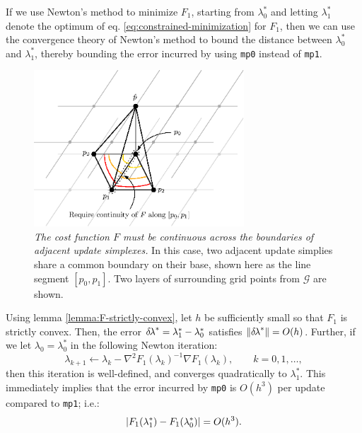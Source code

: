 \documentclass[smallcondensed]{svjour3}
\begin{document}
If we use Newton's method to minimize $F_1$, starting from
$\lambda_0^*$ and letting $\lambda_1^*$ denote the optimum of eq.\@
\ref{eq:constrained-minimization} for $F_1$, then we can use the
convergence theory of Newton's method to bound the distance between
$\lambda_0^*$ and $\lambda_1^*$, thereby bounding the error incurred
by using \texttt{mp0} instead of \texttt{mp1}.
\begin{figure}
  \centering
  \includegraphics[width=0.7\textwidth]{continuity.eps}
  \caption{\emph{The cost function $F$ must be continuous across the
      boundaries of adjacent update simplexes.} In this case, two
    adjacent update simplies share a common boundary on their base,
    shown here as the line segment $[p_0, p_1]$. Two layers of
    surrounding grid points from $\mathcal{G}$ are
    shown.}\label{fig:continuity}
\end{figure}


\begin{theorem}\label{thm:mp0-newton}
  Using lemma \ref{lemma:F-strictly-convex}, let $h$ be sufficiently
  small so that $F_1$ is strictly convex. Then, the error
  ${\delta \hspace{-0.1em} \lambda}^* = \lambda_1^* - \lambda_0^*$ satisfies
  $\left\|{\delta \hspace{-0.1em} \lambda}^*\right\| = O(h)$. Further, if we let
  $\lambda_0 = \lambda_0^*$ in the following Newton iteration:
  \begin{equation}
    \label{eq:lam0-iter-to-lam1}
    \lambda_{k+1} \gets \lambda_k - \nabla^2 F_1(\lambda_k)^{-1} \nabla F_1(\lambda_k), \qquad k = 0, 1, \hdots,
  \end{equation}
  then this iteration is well-defined, and converges quadratically to
  $\lambda_1^*$. This immediately implies that the error incurred by
  \texttt{mp0} is $O(h^3)$ per update compared to \texttt{mp1}; i.e.:
  \begin{equation}
    \label{eq:mp0-error}
    \left|F_1(\lambda_1^*) - F_1(\lambda_0^*)\right| = O(h^3).
  \end{equation}
\end{theorem}
\end{document}
